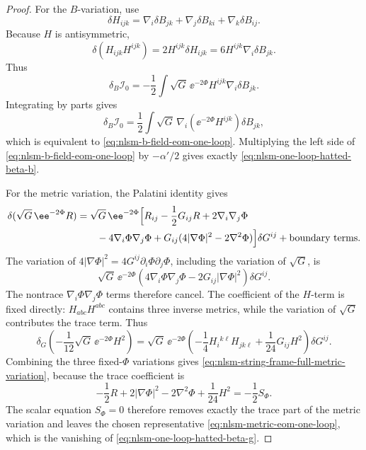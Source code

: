 \begin{proof}
For the \(B\)-variation, use
\begin{equation}
  \delta H_{ijk}
  =
  \nabla_i\delta B_{jk}
  +\nabla_j\delta B_{ki}
  +\nabla_k\delta B_{ij}.
  \label{eq:nlsm-delta-h}
\end{equation}
Because \(H\) is antisymmetric,
\begin{equation}
  \delta(H_{ijk}H^{ijk})
  =
  2H^{ijk}\delta H_{ijk}
  =
  6H^{ijk}\nabla_i\delta B_{jk}.
  \label{eq:nlsm-delta-h-squared}
\end{equation}
Thus
\[
  \delta_B\mathcal I_0
  =
  -\frac12
  \int\sqrt G\,\ee^{-2\Phi}
  H^{ijk}\nabla_i\delta B_{jk}.
\]
Integrating by parts gives
\[
  \delta_B\mathcal I_0
  =
  \frac12
  \int\sqrt G\,
  \nabla_i(\ee^{-2\Phi}H^{ijk})\delta B_{jk},
\]
which is equivalent to \eqref{eq:nlsm-b-field-eom-one-loop}.  Multiplying
the left side of \eqref{eq:nlsm-b-field-eom-one-loop} by
\(-\alpha'/2\) gives exactly
\eqref{eq:nlsm-one-loop-hatted-beta-b}.

For the metric variation, the Palatini identity gives
\[
  \begin{aligned}
  \delta(\sqrt G\,\ee^{-2\Phi}R)
  &=
  \sqrt G\,\ee^{-2\Phi}
  \Bigl[
    R_{ij}
    -\frac12G_{ij}R
    +2\nabla_i\nabla_j\Phi
    \\
    &\qquad
    -4\nabla_i\Phi\nabla_j\Phi
    +G_{ij}(4|\nabla\Phi|^2-2\nabla^2\Phi)
  \Bigr]\delta G^{ij}
  +\text{boundary terms}.
  \end{aligned}
\]
The variation of \(4|\nabla\Phi|^2=4G^{ij}\partial_i\Phi\partial_j\Phi\),
including the variation of \(\sqrt G\), is
\[
  \sqrt G\,\ee^{-2\Phi}
  \left(
    4\nabla_i\Phi\nabla_j\Phi
    -2G_{ij}|\nabla\Phi|^2
  \right)\delta G^{ij}.
\]
The nontrace \(\nabla_i\Phi\nabla_j\Phi\) terms therefore cancel.  The
coefficient of the \(H\)-term is fixed directly: \(H_{abc}H^{abc}\) contains
three inverse metrics, while the variation of \(\sqrt G\) contributes the
trace term.  Thus
\[
  \delta_G
  \left(
    -\frac1{12}\sqrt G\,\ee^{-2\Phi}H^2
  \right)
  =
  \sqrt G\,\ee^{-2\Phi}
  \left(
    -\frac14H_i{}^{k\ell}H_{jk\ell}
    +\frac1{24}G_{ij}H^2
  \right)\delta G^{ij}.
\]
Combining the three fixed-\(\Phi\) variations gives
\eqref{eq:nlsm-string-frame-full-metric-variation}, because the trace
coefficient is
\[
  -\frac12R+2|\nabla\Phi|^2-2\nabla^2\Phi+\frac1{24}H^2
  =
  -\frac12S_\Phi .
\]
The scalar equation \(S_\Phi=0\) therefore removes exactly the trace part of
the metric variation and leaves the chosen representative
\eqref{eq:nlsm-metric-eom-one-loop}, which is the vanishing of
\eqref{eq:nlsm-one-loop-hatted-beta-g}.


\end{proof}
